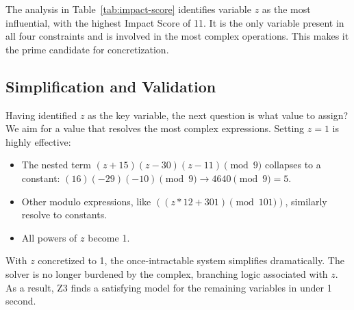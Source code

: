 The analysis in Table~\ref{tab:impact-score} identifies variable $z$ as the most influential, with the highest Impact Score of 11. It is the only variable present in all four constraints and is involved in the most complex operations. This makes it the prime candidate for concretization.

\subsection{Simplification and Validation}

Having identified $z$ as the key variable, the next question is what value to assign? We aim for a value that resolves the most complex expressions. Setting $z=1$ is highly effective:
\begin{itemize}
    \item The nested term $(z+15)(z-30)(z-11) \pmod 9$ collapses to a constant: $(16)(-29)(-10) \pmod 9 \rightarrow 4640 \pmod 9 = 5$.
    \item Other modulo expressions, like $((z*12 + 301) \pmod{101})$, similarly resolve to constants.
    \item All powers of $z$ become 1.
\end{itemize}

With $z$ concretized to 1, the once-intractable system simplifies dramatically. The solver is no longer burdened by the complex, branching logic associated with $z$. As a result, Z3 finds a satisfying model for the remaining variables in under 1 second.



